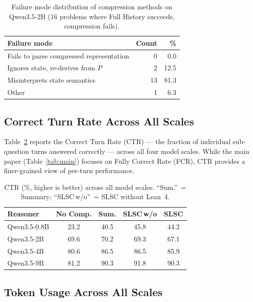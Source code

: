 \begin{table}[h]
\centering
\small
\caption{Failure mode distribution of compression methods on Qwen3.5-2B (16 problems where Full History succeeds, compression fails).}
\label{tab:slsc_failure}
\begin{tabular}{lrr}
  \toprule
  \textbf{Failure mode} & \textbf{Count} & \textbf{\%} \\
  \midrule
  Fails to parse compressed representation & 0  &  0.0 \\
  Ignores state, re-derives from $P$       & 2  & 12.5 \\
  Misinterprets state semantics            & 13 & 81.3 \\
  Other                                    & 1  &  6.3 \\
  \bottomrule
\end{tabular}
\end{table}

\subsection{Correct Turn Rate Across All Scales}
\label{app:ctr_full}

Table~\ref{tab:ctr_full} reports the Correct Turn Rate (CTR) --- the fraction of individual sub-question turns answered correctly --- across all four model scales. While the main paper (Table~\ref{tab:main}) focuses on Fully Correct Rate (FCR), CTR provides a finer-grained view of per-turn performance.

\begin{table}[h]
\centering
\small
\setlength{\tabcolsep}{4pt}
\begin{tabular}{lcccc}
\toprule
\textbf{Reasoner} & \textbf{No Comp.} & \textbf{Sum.} & \textbf{SLSC\,w/o} & \textbf{SLSC} \\
\midrule
Qwen3.5-0.8B & 23.2 & 40.5 & 45.8 & 44.2 \\
Qwen3.5-2B   & 69.6 & 70.2 & 69.3 & 67.1 \\
Qwen3.5-4B   & 80.6 & 86.5 & 86.5 & 85.9 \\
Qwen3.5-9B   & 81.2 & 90.3 & 91.8 & 90.3 \\
\bottomrule
\end{tabular}
\caption{CTR (\%, higher is better) across all model scales. ``Sum.''~= Summary; ``SLSC\,w/o''~= SLSC without Lean~4.}
\label{tab:ctr_full}
\end{table}

\subsection{Token Usage Across All Scales}
\label{app:tokens_full}

